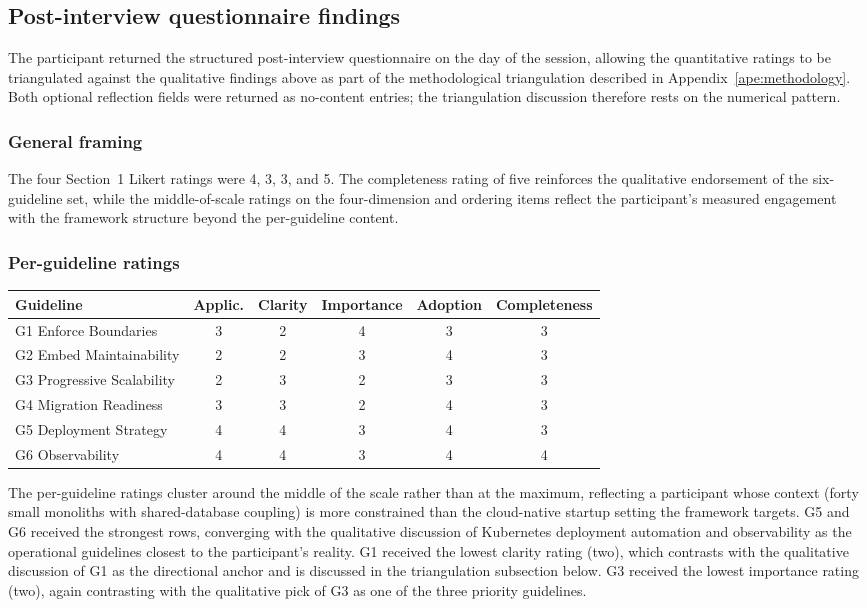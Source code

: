 \subsection*{Post-interview questionnaire findings}

The participant returned the structured post-interview questionnaire on the day of the session, allowing the quantitative ratings to be triangulated against the qualitative findings above as part of the methodological triangulation described in Appendix~\ref{ape:methodology}. Both optional reflection fields were returned as no-content entries; the triangulation discussion therefore rests on the numerical pattern.

\subsubsection*{General framing}

The four Section~1 Likert ratings were 4, 3, 3, and 5. The completeness rating of five reinforces the qualitative endorsement of the six-guideline set, while the middle-of-scale ratings on the four-dimension and ordering items reflect the participant's measured engagement with the framework structure beyond the per-guideline content.

\subsubsection*{Per-guideline ratings}

\begin{longtable}{p{2.5cm} c c c c c}
\toprule
\textbf{Guideline} & \textbf{Applic.} & \textbf{Clarity} & \textbf{Importance} & \textbf{Adoption} & \textbf{Completeness} \\
\midrule
\endhead
G1 Enforce Boundaries & 3 & 2 & 4 & 3 & 3 \\
G2 Embed Maintainability & 2 & 2 & 3 & 4 & 3 \\
G3 Progressive Scalability & 2 & 3 & 2 & 3 & 3 \\
G4 Migration Readiness & 3 & 3 & 2 & 4 & 3 \\
G5 Deployment Strategy & 4 & 4 & 3 & 4 & 3 \\
G6 Observability & 4 & 4 & 3 & 4 & 4 \\
\bottomrule
\end{longtable}

\noindent
The per-guideline ratings cluster around the middle of the scale rather than at the maximum, reflecting a participant whose context (forty small monoliths with shared-database coupling) is more constrained than the cloud-native startup setting the framework targets. G5 and G6 received the strongest rows, converging with the qualitative discussion of Kubernetes deployment automation and observability as the operational guidelines closest to the participant's reality. G1 received the lowest clarity rating (two), which contrasts with the qualitative discussion of G1 as the directional anchor and is discussed in the triangulation subsection below. G3 received the lowest importance rating (two), again contrasting with the qualitative pick of G3 as one of the three priority guidelines.

